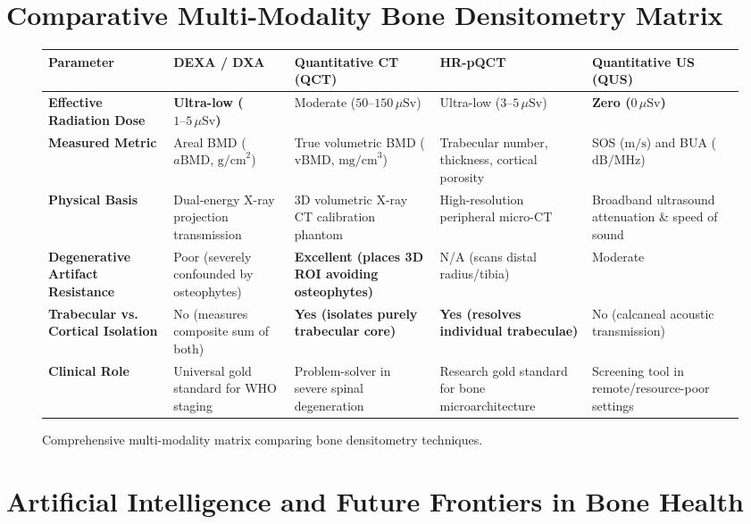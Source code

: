 \documentclass[11pt,a4paper]{article}
\begin{document}
\newpage
\section{Comparative Multi-Modality Bone Densitometry Matrix}

\begin{figure}[htbp]
\centering
\small
\setlength{\tabcolsep}{3pt}
\begin{tabular}{p{2.6cm}p{3.0cm}p{3.1cm}p{3.1cm}p{2.8cm}}
\toprule
\textbf{Parameter} & \textbf{DEXA / DXA} & \textbf{Quantitative CT (QCT)} & \textbf{HR-pQCT} & \textbf{Quantitative US (QUS)} \\
\midrule
\textbf{Effective Radiation Dose} & \textbf{Ultra-low ($1\text{--}5\,\mu\text{Sv}$)} & Moderate ($50\text{--}150\,\mu\text{Sv}$) & Ultra-low ($3\text{--}5\,\mu\text{Sv}$) & \textbf{Zero ($0\,\mu\text{Sv}$)} \\
\addlinespace
\textbf{Measured Metric} & Areal BMD ($a\text{BMD}$, $\text{g/cm}^2$) & True volumetric BMD ($\text{vBMD}$, $\text{mg/cm}^3$) & Trabecular number, thickness, cortical porosity & SOS ($\text{m/s}$) and BUA ($\text{dB/MHz}$) \\
\addlinespace
\textbf{Physical Basis} & Dual-energy X-ray projection transmission & 3D volumetric X-ray CT calibration phantom & High-resolution peripheral micro-CT & Broadband ultrasound attenuation \& speed of sound \\
\addlinespace
\textbf{Degenerative Artifact Resistance} & Poor (severely confounded by osteophytes) & \textbf{Excellent (places 3D ROI avoiding osteophytes)} & N/A (scans distal radius/tibia) & Moderate \\
\addlinespace
\textbf{Trabecular vs. Cortical Isolation} & No (measures composite sum of both) & \textbf{Yes (isolates purely trabecular core)} & \textbf{Yes (resolves individual trabeculae)} & No (calcaneal acoustic transmission) \\
\addlinespace
\textbf{Clinical Role} & Universal gold standard for WHO staging & Problem-solver in severe spinal degeneration & Research gold standard for bone microarchitecture & Screening tool in remote/resource-poor settings \\
\bottomrule
\end{tabular}
\caption{Comprehensive multi-modality matrix comparing bone densitometry techniques.}
\label{tab:densitometry_comparison}
\end{figure}

\section{Artificial Intelligence and Future Frontiers in Bone Health}
\end{document}
